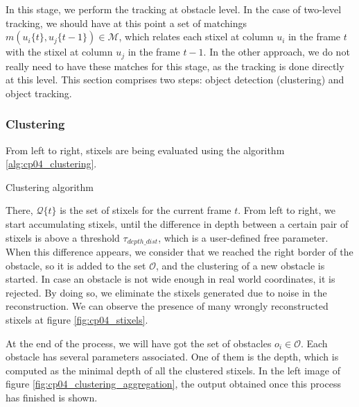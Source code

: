 In this stage, we perform the tracking at obstacle level. In the case of two-level tracking, we should have at this point a set of matchings $m(u_i\{t\},u_j\{t - 1\}) \in \mathcal{M}$, which relates each stixel at column $u_i$ in the frame $t$ with the stixel at column $u_j$ in the frame $t - 1$. In the other approach, we do not really need to have these matches for this stage, as the tracking is done directly at this level. This section comprises two steps: object detection (clustering) and object tracking.

\subsubsection{Clustering}\label{ch:chapter04_01_04_01}

From left to right, stixels are being evaluated using the algorithm \ref{alg:cp04_clustering}.

\begin{algorithm}
\caption{Clustering algorithm}
\label{alg:cp04_clustering}
\begin{algorithmic}
      \EndIf
    \EndIf
  \EndFor
\EndFunction
\end{algorithmic}
\end{algorithm}

There, $\mathcal{Q}\{t\}$ is the set of stixels for the current frame $t$. From left to right, we start accumulating stixels, until the difference in depth between a certain pair of stixels is above a threshold $\tau_{depth\_dist}$, which is a user-defined free parameter. When this difference appears, we consider that we reached the right border of the obstacle, so it is added to the set $\mathcal{O}$, and the clustering of a new obstacle is started. In case an obstacle is not wide enough in real world coordinates, it is rejected. By doing so, we eliminate the stixels generated due to noise in the reconstruction. We can observe the presence of many wrongly reconstructed stixels at figure \ref{fig:cp04_stixels}.

At the end of the process, we will have got the set of obstacles $o_i \in \mathcal{O}$. Each obstacle has several parameters associated. One of them is the depth, which is computed as the minimal depth of all the clustered stixels. In the left image of figure \ref{fig:cp04_clustering_aggregation}, the output obtained once this process has finished is shown.

